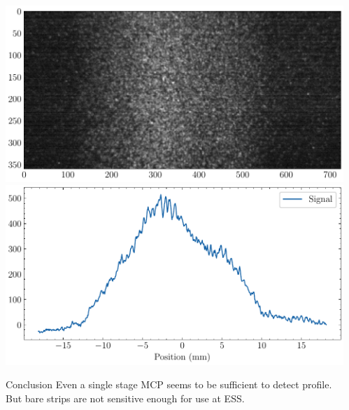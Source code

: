 \begin{frame}[t]
\begin{columns}[T]
\begin{column}{0.45\textwidth}
    \end{column}
    \begin{column}{0.45\textwidth}
      \includegraphics[width=1\textwidth]{04_Test/fig/fig000_limits_IPHI_a}
      \includegraphics[width=1\textwidth]{04_Test/fig/fig000_limits_IPHI_b}
      \begin{alertblock}{Conclusion}
        Even a single stage MCP seems to be sufficient to detect profile.
        But bare strips are not sensitive enough for use at ESS.
      \end{alertblock}
    \end{column}
  \end{columns}
\end{frame}